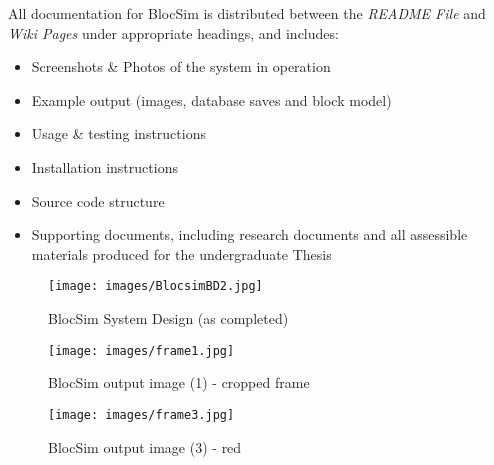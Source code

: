 All documentation for BlocSim is distributed between the \textit{README File} and \textit{Wiki Pages} under appropriate headings, and includes:
\begin{itemize}
\item Screenshots \& Photos of the system in operation
\item Example output (images, database saves and block model)
\item Usage \& testing instructions
\item Installation instructions
\item Source code structure
\item Supporting documents, including research documents and all assessible materials produced for the undergraduate Thesis
\end{itemize}





\begin{figure}[ht!]
\centering
\texttt{[image: images/BlocsimBD2.jpg]}
\caption{BlocSim System Design (as completed)}
\label{im:BlocsimBD2}
\end{figure}

\clearpage

\clearpage

\begin{figure}[ht!]
\centering
\texttt{[image: images/frame1.jpg]}
\caption{BlocSim output image (1) - cropped frame \cite{blocsim}}
\label{im:frame1}
\end{figure}

\begin{figure}[ht!]
\centering
\texttt{[image: images/frame3.jpg]}
\caption{BlocSim output image (3) - red \cite{blocsim}}
\label{im:frame3}
\end{figure}

